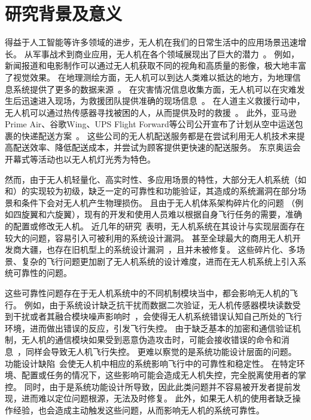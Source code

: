 \section{研究背景及意义}
得益于人工智能等许多领域的进步，无人机在我们的日常生活中的应用场景迅速增长。
从军事战术到商业应用，无人机在各个领域展现出了巨大的潜力~\cite{chabot2018trends,banos2020assessment,patino2009adaptive,shukla2016application,huang2021multi,li2018uav}。
例如，新闻报道和电影制作可以通过无人机获取不同的视角和高质量的影像，极大地丰富了视觉效果。
在地理测绘方面，无人机可以到达人类难以抵达的地方，为地理信息系统提供了更多的数据来源~\cite{news1}。
在灾害情况信息收集方面，无人机可以在灾难发生后迅速进入现场，为救援团队提供准确的现场信息~\cite{news2}。
在人道主义救援行动中，无人机可以通过热传感器寻找被困的人，从而提供及时的救援~\cite{polka2017use}。
此外，亚马逊Prime Air、谷歌Wing、UPS Flight Forward等公司公开宣布了计划从空中运送包裹的快递配送方案~\cite{news3}。
这些公司的无人机配送服务都是在尝试利用无人机技术来提高配送效率、降低配送成本，并尝试为顾客提供更快速的配送服务。
东京奥运会开幕式等活动也以无人机灯光秀为特色。


然而，由于无人机轻量化、高实时性、多应用场景的特性，大部分无人机系统（如和）的实现较为初级，缺乏一定的可靠性和功能验证，其造成的系统漏洞在部分场景和条件下会对无人机产生物理损伤。
且由于无人机体系架构碎片化的问题 （例如四旋翼和六旋翼），现有的开发和使用人员难以根据自身飞行任务的需要，准确的配置或修改无人机。
近几年的研究~\cite{wang2021exploratory,choi2020cyber}表明，无人机系统在其设计与实现层面存在较大的问题，容易引入可被利用的系统设计漏洞。
甚至全球最大的商用无人机开发商大疆，也存在旧机型上的系统设计漏洞~\cite{schiller2023drone}，且并未被修复。
这些碎片化、多场景、复杂的飞行问题更加剧了无人机系统的设计难度，进而在无人机系统上引入系统可靠性的问题。

这些可靠性问题存在于无人机系统中的不同机制模块当中，都会影响无人机的飞行。
例如，由于系统设计缺乏抗干扰而数据二次验证，无人机传感器模块读数受到干扰或者其融合模块噪声影响时~\cite{daneshmand2012low,gaspar2020capture,huang2015gps}，会使得无人机系统错误认知自己所处的飞行环境，进而做出错误的反应，引发飞行失控。
由于缺乏基本的加密和通信验证机制，无人机的通信模块如果受到恶意伪造攻击时，可能会接收错误的命令和消息~\cite{li2018protecting,chen2019machine}，同样会导致无人机飞行失控。
更难以察觉的是系统功能设计层面的问题。
功能设计缺陷~\cite{rvfuzzer,han2022control,wang2021exploratory,choi2020cyber,aggarwal2020path}会使无人机中相应的系统影响飞行中的可靠性和稳定性。
在特定环境、配置或任务的情况下，这些影响可能会造成无人机失控，完全脱离使用者的掌控。
同时，由于是系统功能设计所导致，因此此类问题并不容易被开发者提前发现，进而难以定位问题根源，无法及时修复。
此外，如果无人机的使用者缺乏操作经验，也会造成主动触发这些问题，从而影响无人机的系统可靠性。



